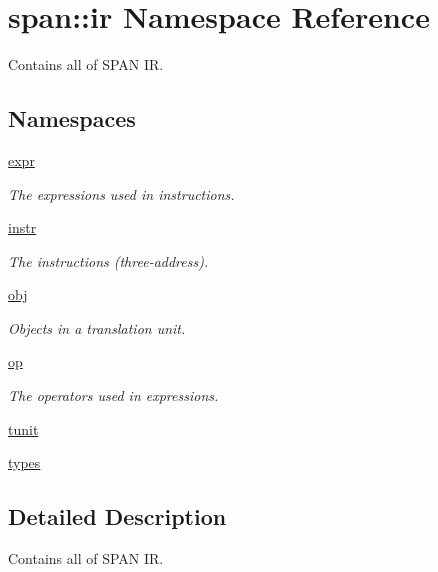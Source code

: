 \hypertarget{namespacespan_1_1ir}{}\section{span\+:\+:ir Namespace Reference}
\label{namespacespan_1_1ir}


Contains all of S\+P\+AN IR.  


\subsection*{Namespaces}
\begin{DoxyCompactItemize}
\item 
 \hyperlink{namespacespan_1_1ir_1_1expr}{expr}
\begin{DoxyCompactList}\small\item\em The expressions used in instructions. \end{DoxyCompactList}\item 
 \hyperlink{namespacespan_1_1ir_1_1instr}{instr}
\begin{DoxyCompactList}\small\item\em The instructions (three-\/address). \end{DoxyCompactList}\item 
 \hyperlink{namespacespan_1_1ir_1_1obj}{obj}
\begin{DoxyCompactList}\small\item\em Objects in a translation unit. \end{DoxyCompactList}\item 
 \hyperlink{namespacespan_1_1ir_1_1op}{op}
\begin{DoxyCompactList}\small\item\em The operators used in expressions. \end{DoxyCompactList}\item 
 \hyperlink{namespacespan_1_1ir_1_1tunit}{tunit}
\item 
 \hyperlink{namespacespan_1_1ir_1_1types}{types}
\end{DoxyCompactItemize}


\subsection{Detailed Description}
Contains all of S\+P\+AN IR. 
